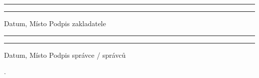 \documentclass[parskip=half]{scrreprt}
\begin{document}
\begin{contract}







\end{contract}
\newpage

\vspace{50pt} 
\noindent\rule{7cm}{.4pt}\hfill\rule{7cm}{.4pt}\par 
\noindent Datum, Místo \hfill Podpis zakladatele

\vspace{50pt} 
\noindent\rule{7cm}{.4pt}\hfill\rule{7cm}{.4pt}\par 
\noindent Datum, Místo \hfill Podpis správce / správců

.
\end{document}
